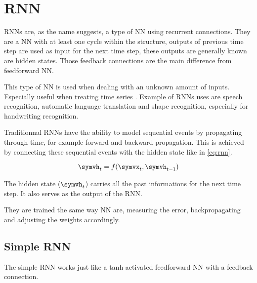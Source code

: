 \section{\acl{RNN}}\label{sec:rnn}

\acp{RNN} are, as the name suggests, a type of \ac{NN} using recurrent connections. They are a \ac{NN} with at least one cycle within the structure, outputs of previous time step are used as input for the next time step, these outputs are generally known are hidden states. Those feedback connections are the main difference from feedforward \ac{NN}.

This type of \ac{NN} is used when dealing with an unknown amount of inputs. Especially useful when treating time series \cite{rnn}. Example of \acp{RNN} uses are speech recognition, automatic language translation \cite{gru} and shape recognition, especially for handwriting recognition.

Traditionnal \acp{RNN} have the ability to model sequential events by propagating through time, for example forward and backward propagation. This is achieved by connecting these sequential events with the hidden state like in \cref{eq:rnn}.

\begin{equation}\label{eq:rnn}
  \symvh_t=f(\symvx_t,\symvh_{t-1})
\end{equation}

The hidden state ($\symvh_t$) carries all the past informations for the next time step. It also serves as the output of the \ac{RNN}.

They are trained the same way \ac{NN} are, measuring the error, backpropagating and adjusting the weights accordingly.

\subsection{Simple \acl{RNN}}

The simple \ac{RNN} works just like a \ac{tanh} activated feedforward \ac{NN} with a feedback connection.

\begin{figure}[H]
  \centering
  \begin{minipage}{\columnwidth}
  \end{minipage}
  \begin{minipage}{\columnwidth}
  \end{minipage}
  \caption{}
\end{figure}

